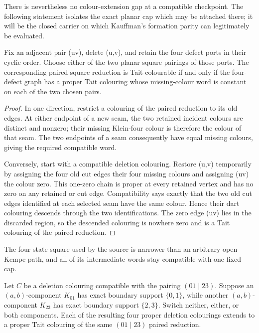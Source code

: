 There is nevertheless no colour-extension gap at a compatible checkpoint.
The following statement isolates the exact planar cap which may be attached
there; it will be the closed carrier on which Kauffman's formation parity can
legitimately be evaluated.

\begin{lemma}
\label{lem:adjacent-pair-compatible-cap-extension}
Fix an adjacent pair (uv), delete (u,v), and retain the four defect ports
in their cyclic order.  Choose either of the two planar square pairings of
those ports.  The corresponding paired square reduction is Tait-colourable
if and only if the four-defect graph has a proper Tait colouring whose
missing-colour word is constant on each of the two chosen pairs.
\end{lemma}

\begin{proof}
In one direction, restrict a colouring of the paired reduction to its old
edges.  At either endpoint of a new seam, the two retained incident colours
are distinct and nonzero; their missing Klein-four colour is therefore the
colour of that seam.  The two endpoints of a seam consequently have equal
missing colours, giving the required compatible word.

Conversely, start with a compatible deletion colouring.  Restore (u,v)
temporarily by assigning the four old cut edges their four missing colours
and assigning (uv) the colour zero.  This one-zero chain is proper at every
retained vertex and has no zero on any retained or cut edge.  Compatibility
says exactly that the two old cut edges identified at each selected seam
have the same colour.  Hence their dart colouring descends through the two
identifications.  The zero edge (uv) lies in the discarded region, so the
descended colouring is nowhere zero and is a Tait colouring of the paired
reduction.
\end{proof}

The four-state square used by the source is narrower than an arbitrary open
Kempe path, and all of its intermediate words stay compatible with one fixed
cap.

\begin{lemma}
\label{lem:same-side-kempe-square-cap-extension}
Let \(C\) be a deletion colouring compatible with the pairing
\((01\mid 23)\).  Suppose an \((a,b)\)-component \(K_{01}\) has exact boundary
support \(\{0,1\}\), while another \((a,b)\)-component \(K_{23}\) has exact
boundary support \(\{2,3\}\).  Switch neither, either, or both components.
Each of the resulting four proper deletion colourings extends to a proper
Tait colouring of the same \((01\mid 23)\) paired reduction.
\end{lemma}

